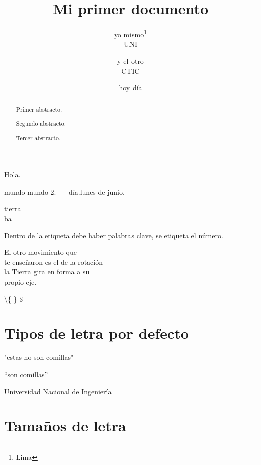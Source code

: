 \documentclass{article}
\title{Mi primer documento}
\author{yo mismo\thanks{Lima}\\UNI\and y el otro\\CTIC}
\date{hoy día}
\begin{document}
\maketitle
\thispagestyle{empty}

\begin{abstract}
Primer abstracto.
\end{abstract}

\renewcommand{\abstractname}{Abstract}
\begin{abstract}
Segundo abstracto.
\end{abstract}
\renewcommand{\abstractname}{}

\begin{abstract}
Tercer abstracto.
\end{abstract}

\newpage
\vspace*{4cm}
Hola.

\vspace{2cm}

\hspace*{3cm} mundo \hspace{4cm} mundo 2. \ \ \ día.\quad lunes de junio.

tierra\\ b\medskip a
\enlargethispage{2mm}
\lipsum[2-4]

Dentro de la etiqueta debe haber palabras clave,  se etiqueta el número.

\newpage
\begin{flushright}
El otro movimiento que\\ te enseñaron es el de la rotación\\ la Tierra gira en forma a su\\ propio eje. 
\end{flushright}

\textbackslash \{ \} \$
\section[Letra]{Tipos de letra por defecto}
"estas no son comillas"

``son comillas''


Universidad Nacional de Ingeniería
\section[Tamaño]{Tamaños de letra}\label{sec:2}
\end{document}
